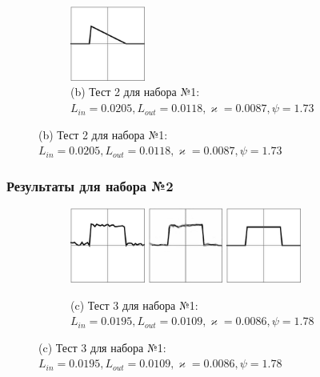 \documentclass{beamer}
\renewcommand{\kappa}{\varkappa}
\begin{document}
\begin{frame}
\begin{figure}[!hp]
\begin{subfigure}{\textwidth}
			\hfill
			\includegraphics[width=0.27\textwidth]{2}
			\caption*{\small (b) Тест 2 для набора №1:
				$L_{in} = 0.0205,
				L_{out} = 0.0118,
				\kappa = 0.0087,
				\psi = 1.73
				$}
		\end{subfigure}
	\end{figure}
\end{frame}

\begin{frame}
	\frametitle{Результаты для набора №2}
	\vspace{-2em}
	\begin{figure}[!hp]
		\centering
		\vspace{1em}
		\begin{subfigure}{\textwidth}
			\centering
			\includegraphics[width=0.27\textwidth]{res_n1_5}
			\hfill
			\includegraphics[width=0.27\textwidth]{res_n2_6}
			\hfill
			\includegraphics[width=0.27\textwidth]{3}
			\caption*{\small (c) Тест 3 для набора №1: $L_{in} = 0.0195, L_{out} = 0.0109, \kappa = 0.0086, \psi = 1.78$}

\end{subfigure}
\end{figure}
\end{frame}
\end{document}
